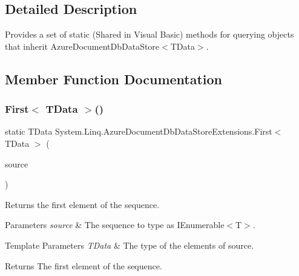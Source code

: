 \subsection{Detailed Description}
Provides a set of static (Shared in Visual Basic) methods for querying objects that inherit Azure\+Document\+Db\+Data\+Store$<$\+T\+Data$>$. 



\subsection{Member Function Documentation}
\mbox{\label{classSystem_1_1Linq_1_1AzureDocumentDbDataStoreExtensions_af216b6d4045dc5bb33fc0c4c36b7a67e_af216b6d4045dc5bb33fc0c4c36b7a67e}} 
\subsubsection{\texorpdfstring{First$<$ T\+Data $>$()}{First< TData >()}\hspace{0.1cm}{\footnotesize\ttfamily [1/2]}}
{\footnotesize\ttfamily static T\+Data System.\+Linq.\+Azure\+Document\+Db\+Data\+Store\+Extensions.\+First$<$ T\+Data $>$ (\begin{DoxyParamCaption}\item[{this \hyperlink{classCqrs_1_1Azure_1_1DocumentDb_1_1DataStores_1_1AzureDocumentDbDataStore}{Azure\+Document\+Db\+Data\+Store}$<$ T\+Data $>$}]{source }\end{DoxyParamCaption})\hspace{0.3cm}{\ttfamily [static]}}



Returns the first element of the sequence. 


\begin{DoxyParams}{Parameters}
{\em source} & The sequence to type as I\+Enumerable$<$\+T$>$.\\
\hline
\end{DoxyParams}

\begin{DoxyTemplParams}{Template Parameters}
{\em T\+Data} & The type of the elements of source.\\
\hline
\end{DoxyTemplParams}
\begin{DoxyReturn}{Returns}
The first element of the sequence.
\end{DoxyReturn}

